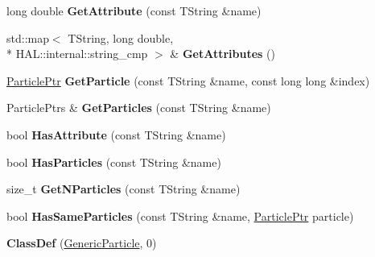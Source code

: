 \begin{DoxyCompactItemize}
\item 
\hypertarget{class_h_a_l_1_1_generic_particle_aa0dcd8725c4ca8c7c927b79fa6565e6b}{long double {\bfseries Get\-Attribute} (const T\-String \&name)}\label{class_h_a_l_1_1_generic_particle_aa0dcd8725c4ca8c7c927b79fa6565e6b}

\item 
\hypertarget{class_h_a_l_1_1_generic_particle_ac592f263b62437d8176156c640d2d59d}{std\-::map$<$ T\-String, long double, \\*
H\-A\-L\-::internal\-::string\-\_\-cmp $>$ \& {\bfseries Get\-Attributes} ()}\label{class_h_a_l_1_1_generic_particle_ac592f263b62437d8176156c640d2d59d}

\item 
\hypertarget{class_h_a_l_1_1_generic_particle_aa6f6dd45c53b81bdcda0daf9872d3dd6}{\hyperlink{class_h_a_l_1_1_generic_particle}{Particle\-Ptr} {\bfseries Get\-Particle} (const T\-String \&name, const long long \&index)}\label{class_h_a_l_1_1_generic_particle_aa6f6dd45c53b81bdcda0daf9872d3dd6}

\item 
\hypertarget{class_h_a_l_1_1_generic_particle_ae82f028aef354682aaded70b93da06de}{Particle\-Ptrs \& {\bfseries Get\-Particles} (const T\-String \&name)}\label{class_h_a_l_1_1_generic_particle_ae82f028aef354682aaded70b93da06de}

\item 
\hypertarget{class_h_a_l_1_1_generic_particle_a09766ae2f607206b0bb623855f5d11d2}{bool {\bfseries Has\-Attribute} (const T\-String \&name)}\label{class_h_a_l_1_1_generic_particle_a09766ae2f607206b0bb623855f5d11d2}

\item 
\hypertarget{class_h_a_l_1_1_generic_particle_ac0f562c1225127b099ef7df56ae3177d}{bool {\bfseries Has\-Particles} (const T\-String \&name)}\label{class_h_a_l_1_1_generic_particle_ac0f562c1225127b099ef7df56ae3177d}

\item 
\hypertarget{class_h_a_l_1_1_generic_particle_afddc36ec1e6dad1c155449386ea716b6}{size\-\_\-t {\bfseries Get\-N\-Particles} (const T\-String \&name)}\label{class_h_a_l_1_1_generic_particle_afddc36ec1e6dad1c155449386ea716b6}

\item 
\hypertarget{class_h_a_l_1_1_generic_particle_a968d9fb1e1800b48182055ec8df38e39}{bool {\bfseries Has\-Same\-Particles} (const T\-String \&name, \hyperlink{class_h_a_l_1_1_generic_particle}{Particle\-Ptr} particle)}\label{class_h_a_l_1_1_generic_particle_a968d9fb1e1800b48182055ec8df38e39}

\item 
\hypertarget{class_h_a_l_1_1_generic_particle_ad23fc850d01f55da3b3c27366504289e}{{\bfseries Class\-Def} (\hyperlink{class_h_a_l_1_1_generic_particle}{Generic\-Particle}, 0)}\label{class_h_a_l_1_1_generic_particle_ad23fc850d01f55da3b3c27366504289e}

\end{DoxyCompactItemize}
